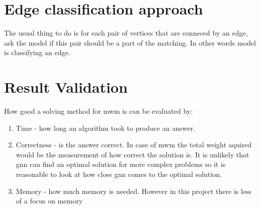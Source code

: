 \section{Edge classification approach}

The usual thing to do is for each pair of vertices that are conneced by an edge, ask the model if this pair should be a part of the matching. In other words model is classifying an edge. 

\section{Result Validation}

How good a solving method for \gls{mwm} is can be evaluated by:

\begin{enumerate}
\item Time - how long an algorithm took to produce an answer.
\item Correctness - is the answer correct. In case of \gls{mwm} the total weight aquired would be the measurement of how correct the solution is. It is unlikely that \gls{gnn} can find an optimal solution for more complex problems so it is reasonable to look at how close \gls{gnn} comes to the optimal solution.
\item Memory - how much memory is needed. However in this project there is less of a focus on memory
\end{enumerate}

